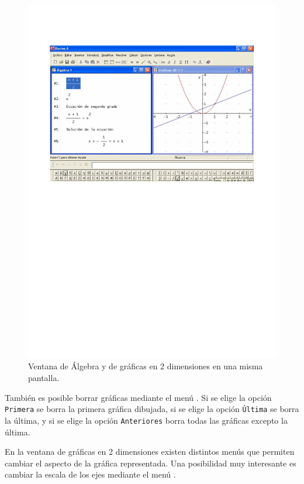 \begin{figure}[h!]
\begin{center}
\includegraphics[scale=0.6]{img/introduccion_derive/expresionesygraficas}
\caption{Ventana de Álgebra y de gráficas en 2 dimensiones en una
misma pantalla.} \label{g:expresionesygraficas}
\end{center}
\end{figure}

También es posible borrar gráficas mediante el menú
. Si se elige la opción
\texttt{Primera} se borra la primera gráfica dibujada, si se elige
la opción \texttt{Última} se borra la última, y si se elige la
opción \texttt{Anteriores} borra todas las gráficas excepto la
última.

En la ventana de gráficas en 2 dimensiones existen distintos menús
que permiten cambiar el aspecto de la gráfica representada. Una
posibilidad muy interesante es cambiar la escala de los ejes
mediante el menú .

